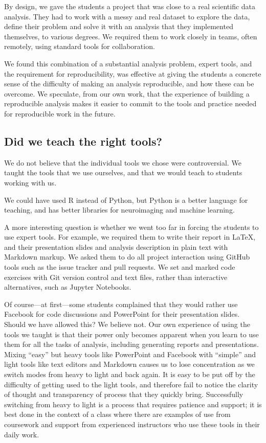 By design, we gave the students a project that was close to a real
scientific data analysis.  They had to work with a messy and real dataset to
explore the data, define their problem and solve it with an analysis that they
implemented themselves, to various degrees.  We required them to work closely
in teams, often remotely, using standard tools for collaboration.

We found this combination of a substantial analysis problem, expert tools, and
the requirement for reproducibility, was effective at giving the students a
concrete sense of the difficulty of making an analysis reproducible, and how
these can be overcome.  We speculate, from our own work, that the
experience of building a reproducible analysis makes it easier to commit to
the tools and practice needed for reproducible work in the future.

\subsection{Did we teach the right tools?}

We do not believe that the individual tools we chose were controversial. We
taught the tools that we use ourselves, and that we would teach to
students working with us.

We could have used R instead of Python, but Python is a better language for
teaching, and has better libraries for neuroimaging and machine learning.

A more interesting question is whether we went too far in forcing the students
to use expert tools.  For example, we required them to write their
report in \LaTeX, and their presentation slides and analysis description in
plain text with Markdown markup.  We asked them to do all project interaction
using GitHub tools such as the issue tracker and pull requests.  We set and
marked code exercises with Git version control and text files, rather than
interactive alternatives, such as Jupyter Notebooks.

Of course---at first---some students complained that they would rather use
Facebook for code discussions and PowerPoint for their presentation slides.
Should we have allowed this?  We believe not.  Our own experience
of using the tools we taught is that their power only becomes apparent
when you learn to use them for all the tasks of analysis, including generating
reports and presentations.  Mixing ``easy'' but heavy tools like PowerPoint
and Facebook with ``simple'' and light tools like text editors and Markdown
causes us to lose concentration as we switch modes from heavy to light and
back again. It is easy to be put off by the difficulty of getting used to the
light tools, and therefore fail to notice the clarity of thought and
transparency of process that they quickly bring.  Successfully switching from
heavy to light is a process that requires patience and support; it is best
done in the context of a class where there are examples of use from coursework
and support from experienced instructors who use these tools in their daily
work.

